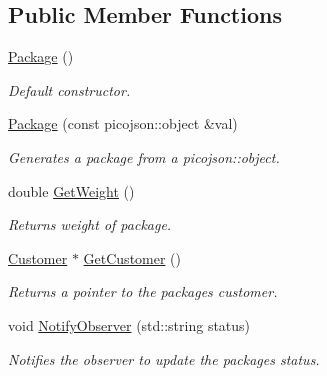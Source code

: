 \subsection*{Public Member Functions}
\begin{DoxyCompactItemize}
\item 
\mbox{\label{classcsci3081_1_1Package_a3be008ddf9372479ce719c2e823e368e}} 
\hyperlink{classcsci3081_1_1Package_a3be008ddf9372479ce719c2e823e368e}{Package} ()
\begin{DoxyCompactList}\small\item\em Default constructor. \end{DoxyCompactList}\item 
\mbox{\label{classcsci3081_1_1Package_ad4665f319d2ebf5cdf9de133f0f476b3}} 
\hyperlink{classcsci3081_1_1Package_ad4665f319d2ebf5cdf9de133f0f476b3}{Package} (const picojson\+::object \&val)
\begin{DoxyCompactList}\small\item\em Generates a package from a picojson\+::object. \end{DoxyCompactList}\item 
\mbox{\label{classcsci3081_1_1Package_a34cb292d5b89e61724b1f8f885cc71cc}} 
double \hyperlink{classcsci3081_1_1Package_a34cb292d5b89e61724b1f8f885cc71cc}{Get\+Weight} ()
\begin{DoxyCompactList}\small\item\em Returns weight of package. \end{DoxyCompactList}\item 
\mbox{\label{classcsci3081_1_1Package_a4f9452af878f2f119ab98b6a460afce2}} 
\hyperlink{classcsci3081_1_1Customer}{Customer} $\ast$ \hyperlink{classcsci3081_1_1Package_a4f9452af878f2f119ab98b6a460afce2}{Get\+Customer} ()
\begin{DoxyCompactList}\small\item\em Returns a pointer to the package\textquotesingle{}s customer. \end{DoxyCompactList}\item 
\mbox{\label{classcsci3081_1_1Package_a0d19deea6561850c95c6c4837b1a6b43}} 
void \hyperlink{classcsci3081_1_1Package_a0d19deea6561850c95c6c4837b1a6b43}{Notify\+Observer} (std\+::string status)
\begin{DoxyCompactList}\small\item\em Notifies the observer to update the package\textquotesingle{}s status. \end{DoxyCompactList}\end{DoxyCompactItemize}


